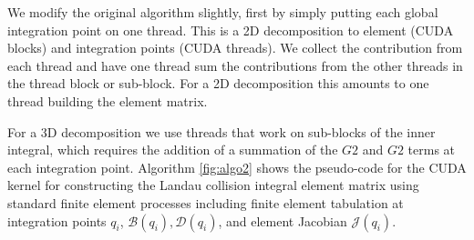 \documentclass[12pt]{siamart}
\begin{document}
We  modify the original algorithm slightly, first by simply putting each global integration point on one thread.
This is a 2D decomposition to element (CUDA blocks) and integration points (CUDA threads).
We collect the contribution from each thread and have one thread sum the contributions from the other threads in the thread block or sub-block.
For a 2D decomposition this amounts to one thread building the element matrix.

For a 3D decomposition we use threads that work on sub-blocks of the inner integral, which requires the addition of a summation of the $G2$ and $G2$ terms at each integration point.
Algorithm \ref{fig:algo2} shows the pseudo-code for the CUDA kernel for constructing the Landau collision integral element matrix using standard finite element processes including finite element tabulation at integration points $q_i$, $\mathcal{B}\left(q_i\right),  \mathcal{D}\left(q_i\right)$, and element Jacobian $\mathcal{J}\left(q_i\right)$.
\end{document}

